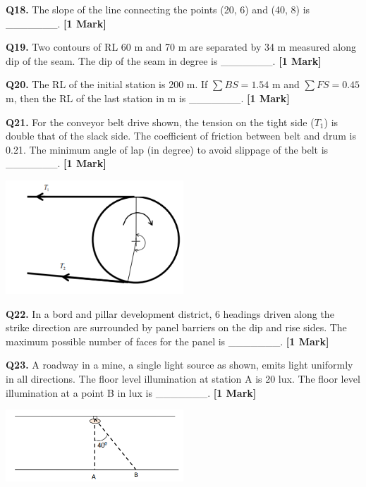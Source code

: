\documentclass[11pt]{article}
\newcommand{\questiona}[2]{
    \noindent\textbf{Q#2.} #1 \hfill \textbf{[1 Mark]}
}
\begin{document}
\questiona{The slope of the line connecting the points (20, 6) and (40, 8) is \_\_\_\_\_\_\_.}{18}
\vspace{0.5cm}

\questiona{Two contours of RL 60 m and 70 m are separated by 34 m measured along dip of the seam. The dip of the seam in degree is \_\_\_\_\_\_\_.}{19}
\vspace{0.5cm}

\questiona{The RL of the initial station is 200 m. If \(\sum BS = 1.54\) m and \(\sum FS = 0.45\) m, then the RL of the last station in m is \_\_\_\_\_\_\_.}{20}
\vspace{0.5cm}

\questiona{For the conveyor belt drive shown, the tension on the tight side (\(T_1\)) is double that of the slack side. The coefficient of friction between belt and drum is 0.21. The minimum angle of lap (in degree) to avoid slippage of the belt is \_\_\_\_\_\_\_.}{21}
\begin{center}
\includegraphics[width=0.5\textwidth]{figures/21.png}
\end{center}
\vspace{0.5cm}

\questiona{In a bord and pillar development district, 6 headings driven along the strike direction are surrounded by panel barriers on the dip and rise sides. The maximum possible number of faces for the panel is \_\_\_\_\_\_\_.}{22}
\vspace{0.5cm}

\questiona{A roadway in a mine, a single light source as shown, emits light uniformly in all directions. The floor level illumination at station A is 20 lux. The floor level illumination at a point B in lux is \_\_\_\_\_\_\_.}{23}
\begin{center}
\includegraphics[width=0.5\textwidth]{figures/23.png}
\end{center}
\vspace{0.5cm}
\end{document}
